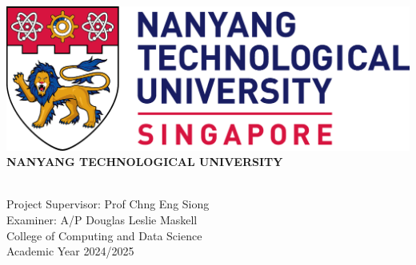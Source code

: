 \makeatletter
\begin{titlepage}
\begin{center}

\includegraphics[width=\textwidth]{figures/ntu_logo.png}
\\[2cm]

\uppercase{\textbf{\large{Nanyang Technological University}}}
\\[3cm]

\uppercase{\textbf{\large{\@title}}}

\vfill
\@author
\\[3cm]

Project Supervisor: Prof Chng Eng Siong\\
Examiner: A/P Douglas Leslie Maskell
\\[2cm]
College of Computing and Data Science\\
Academic Year 2024/2025

\end{center}
\end{titlepage}
\makeatother
